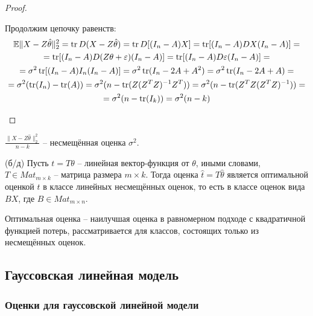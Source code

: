 \begin{proof}
\begin{itemize}
        Продолжим цепочку равенств:
        \begin{multline*}
            \mathbb{E} \|X - Z\hat{\theta}\|_2^2 = \operatorname{tr} D (X - Z\hat{\theta}) = \operatorname{tr} D [(I_n - A) X] = \operatorname{tr} [(I_n - A) DX (I_n - A)] =
            \\
            = \operatorname{tr} [(I_n - A) D(Z\theta + \varepsilon) (I_n - A)] = \operatorname{tr} [(I_n - A) D\varepsilon (I_n - A)] =
            \\
            = \sigma^2 \operatorname{tr} [(I_n - A) I_n (I_n - A)] = \sigma^2 \operatorname{tr}(I_n - 2A + A^2) = \sigma^2 \operatorname{tr}(I_n - 2A + A) =
            \\
            = \sigma^2 (\operatorname{tr}(I_n) - \operatorname{tr}(A)) = \sigma^2 (n - \operatorname{tr}(Z (Z^T Z)^{-1} Z^T)) = \sigma^2 (n - \operatorname{tr}(Z^T Z (Z^T Z)^{-1})) =
            \\
            = \sigma^2 (n - \operatorname{tr}(I_k)) = \sigma^2(n-k)
        \end{multline*}
    \end{itemize}
\end{proof}

\begin{corollary}
    $\frac{\|X - Z\hat{\theta}\|_2^2}{n-k}$ -- несмещённая оценка $\sigma^2$.
\end{corollary}

\begin{theorem} (б/д)
    Пусть $t = T\theta$ -- линейная вектор-функция от $\theta$, иными словами, $T \in Mat_{m \times k}$ -- матрица размера $m \times k$. Тогда оценка $\hat{t} = T \hat{\theta}$ является оптимальной оценкой $t$ в классе линейных несмещённых оценок, то есть в классе оценок вида $B X$, где $B \in Mat_{m \times n}$.
\end{theorem}

\begin{reminder}
     Оптимальная оценка -- наилучшая оценка в равномерном подходе с квадратичной функцией потерь, рассматривается для классов, состоящих только из несмещённых оценок.
\end{reminder}

\subsection{Гауссовская линейная модель}

\subsubsection{Оценки для гауссовской линейной модели}

